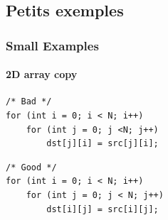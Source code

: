 \documentclass[xcolor={x11names,svgnames}]{beamer}
\begin{document}

\subsection{Petits exemples}

\begin{frame}[label=applications,fragile=singleslide]
\frametitle{Small Examples}
\framesubtitle{2D array copy}

\begin{verbatim}
/* Bad */
for (int i = 0; i < N; i++)
    for (int j = 0; j <N; j++)
        dst[j][i] = src[j][i];
\end{verbatim}

\bigskip

\begin{verbatim}
/* Good */
for (int i = 0; i < N; i++)
    for (int j = 0; j < N; j++)
        dst[i][j] = src[i][j];
\end{verbatim}
\end{frame}

\end{document}
